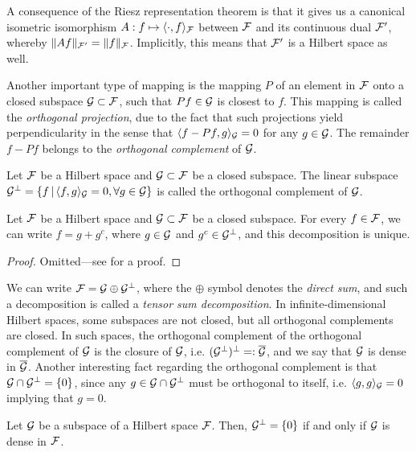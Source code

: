 A consequence of the Riesz representation theorem is that it gives us a canonical isometric isomorphism $A:f\mapsto \langle\cdot,f\rangle_{\mathcal F}$ between ${\mathcal F}$ and its continuous dual ${\mathcal F}'$, whereby $\lVert Af\rVert_{{\mathcal F}'} = \lVert f\rVert_{\mathcal F}$.
Implicitly, this means that ${\mathcal F}'$ is a Hilbert space as well.

Another important type of mapping is the mapping $P$ of an element in ${\mathcal F}$ onto a closed subspace ${\mathcal G}\subset{\mathcal F}$, such that $Pf \in {\mathcal G}$ is closest to $f$.
This mapping is called the \emph{orthogonal projection}, due to the fact that such projections yield perpendicularity in the sense that $\langle f-Pf,g\rangle_{\mathcal G} = 0$ for any $g\in{\mathcal G}$.
The remainder $f - Pf$ belongs to the \emph{orthogonal complement} of ${\mathcal G}$.

\begin{definition}
  Let ${\mathcal F}$ be a Hilbert space and ${\mathcal G} \subset {\mathcal F}$ be a closed subspace.
  The linear subspace ${\mathcal G}^\bot = \{ f \,|\, \langle f,g\rangle_{\mathcal G} = 0, \forall g \in {\mathcal G} \}$ is called the orthogonal complement of ${\mathcal G}$.
\end{definition}

\begin{theorem}
  Let ${\mathcal F}$ be a Hilbert space and ${\mathcal G} \subset {\mathcal F}$ be a closed subspace.
  For every $f \in {\mathcal F}$, we can write $f = g + g^c$, where $g \in {\mathcal G}$ and $g^c \in {\mathcal G}^\bot$, and this decomposition is unique.
\end{theorem}

\begin{proof}
  Omitted---see \citet[Theorem 4.11]{rudin1987real} for a proof.
\end{proof}

We can write ${\mathcal F} = {\mathcal G} \oplus {\mathcal G}^\bot$, where the $\oplus$ symbol denotes the \emph{direct sum}, and such a decomposition is called a \emph{tensor sum decomposition}.
In infinite-dimensional Hilbert spaces, some subspaces are not closed, but all orthogonal complements are closed. 
In such spaces, the orthogonal complement of the orthogonal complement of ${\mathcal G}$ is the closure of ${\mathcal G}$, i.e. $({\mathcal G}^\bot)^\bot =: \overline {{\mathcal G}}$, and we say that ${\mathcal G}$ is dense in $\overline {{\mathcal G}}$.
Another interesting fact regarding the orthogonal complement is that ${\mathcal G} \cap {\mathcal G}^\bot = \{ 0 \}$, since any $g\in {\mathcal G} \cap {\mathcal G}^\bot$ must be orthogonal to itself, i.e. $\langle g,g\rangle_{\mathcal G} = 0$ implying that $g=0$.

\begin{corollary}\label{thm:orthdecomp2}
  Let ${\mathcal G}$ be a subspace of a Hilbert space ${\mathcal F}$. 
  Then, ${\mathcal G}^\bot = \{0\}$ if and only if ${\mathcal G}$ is dense in ${\mathcal F}$.
\end{corollary}


